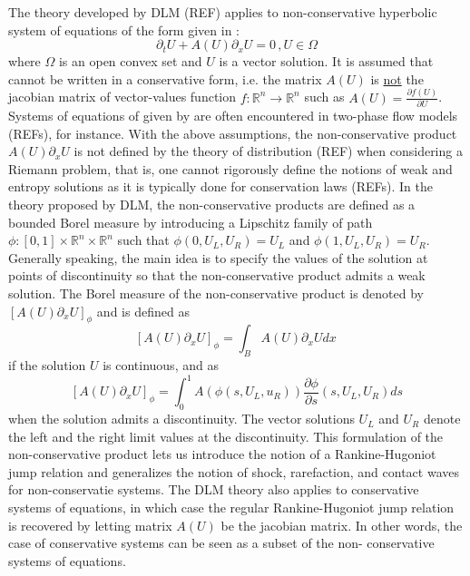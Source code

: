 \documentclass[times,doublespace]{fldauth}%
\begin{document}
The theory developed by DLM (REF) applies to non-conservative hyperbolic system of equations of the form given in :
%
\begin{equation}\label{eq:nc-syst-eq}
\partial_t U + A(U) \partial_x U = 0 \, , U \in \Omega
\end{equation}
%
where $\Omega$ is an open convex set and $U$ is a vector solution. It is assumed that  cannot be 
written in a conservative form, i.e. the matrix $A(U)$ is \underline{not} the jacobian matrix of vector-values function $f: 
\mathbb{R}^n \to \mathbb{R}^n$ such as $A(U) = \frac{\partial f(U)}{\partial U}$. Systems of equations of given by  
 are often encountered in two-phase flow models (REFs), for instance. With the above assumptions, 
the non-conservative product $A(U) \partial_x U$ is not defined by the theory of distribution (REF)  when considering 
a Riemann problem, that is, one cannot rigorously define the notions of weak and entropy solutions as it is typically done for 
conservation laws (REFs). In the theory proposed by DLM, the non-conservative products are defined as a bounded Borel 
measure by introducing a Lipschitz family of path $\phi: [0,1] \times \mathbb{R}^n \times \mathbb{R}^n$ such that 
$\phi(0, U_L, U_R) = U_L$ and $\phi(1, U_L, U_R) = U_R$. Generally speaking, the main idea is to specify the values of the 
solution at points of discontinuity so that the non-conservative product admits a weak solution. The Borel measure of 
the non-conservative product is denoted by $\left[ A(U) \partial_x U \right]_\phi$ and is defined as
%
\begin{equation}
\left[ A(U) \partial_x U \right]_\phi = \int_B A(U) \partial_x U dx \, 
\end{equation}
%
if the solution $U$ is continuous, and as
%
\begin{equation}
\left[ A(U) \partial_x U \right]_\phi = \int_0^1 A(\phi(s,U_L,u_R)) \frac{\partial \phi}{\partial s}(s, U_L, U_R)ds 
\end{equation}
%
when the solution admits a discontinuity. The vector solutions $U_L$ and $U_R$ denote the left and the right limit values at the discontinuity. This formulation of the non-conservative product lets us introduce the notion 
of a Rankine-Hugoniot jump relation and generalizes the notion of shock, rarefaction, and contact waves 
for non-conservatie systems. The DLM theory also applies to conservative systems of 
equations, in which case the regular Rankine-Hugoniot jump relation is recovered by letting matrix $A(U)$ be the
jacobian matrix. In other words, the case of conservative systems can be seen as a subset of the non-
conservative systems of equations. 
\end{document}
